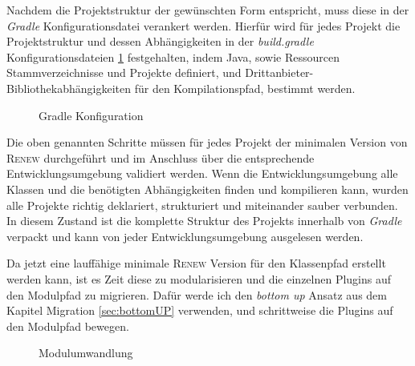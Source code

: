 	Nachdem die Projektstruktur der gewünschten Form entspricht, muss diese in der \textit{Gradle} Konfigurationsdatei verankert werden. Hierfür wird für jedes Projekt die Projektstruktur und dessen Abhängigkeiten in der \textit{build.gradle} Konfigurationsdateien \ref{fig:gradle_project} festgehalten, indem Java, sowie Ressourcen Stammverzeichnisse und Projekte definiert, und Drittanbieter-Bibliothekabhängigkeiten für den Kompilationspfad, bestimmt werden. \bigbreak

 		\begin{figure}[h!]
		\centering
		\begin{minipage}{7cm}
		\end{minipage}
		\caption{Gradle Konfiguration}
		\label{fig:gradle_project}
	\end{figure}
 	Die oben genannten Schritte müssen für jedes Projekt der minimalen Version von \textsc{Renew} durchgeführt und im Anschluss über die entsprechende Entwicklungsumgebung  validiert werden. Wenn die Entwicklungsumgebung alle Klassen und die benötigten Abhängigkeiten finden und kompilieren kann, wurden alle Projekte richtig deklariert, strukturiert und miteinander sauber verbunden. In diesem Zustand ist die komplette Struktur des Projekts innerhalb von \textit{Gradle} verpackt und kann von jeder Entwicklungsumgebung ausgelesen werden. \newline

	Da jetzt eine lauffähige minimale \textsc{Renew} Version für den Klassenpfad erstellt werden kann, ist es Zeit diese zu modularisieren und die einzelnen Plugins auf den Modulpfad zu migrieren. Dafür werde ich den \textit{bottom up} Ansatz aus dem Kapitel Migration \ref{sec:bottomUP} verwenden, und schrittweise die Plugins auf den Modulpfad bewegen.

	\begin{figure}[h!]
		\centering
		\begin{minipage}{7cm}
		\end{minipage}
		\caption{Modulumwandlung}
		\label{fig:module_project}
	\end{figure}

